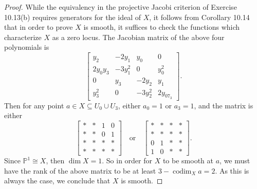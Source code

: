 \documentclass[12pt]{article}
\newcommand{\isp}[1]{\quad\text{#1}\quad}
\newcommand{\<}{\langle}
\renewcommand{\>}{\rangle}
\newcommand{\isom}{\cong}
\renewcommand{\P}{\mathbb{P}}
\DeclareMathOperator{\codim}{codim}
\begin{document}
\begin{proof}
    While the equivalency in the projective Jacobi criterion of Exercise 10.13(b) requires generators for the ideal of $X$, it follows from Corollary 10.14 that in order to prove $X$ is smooth, it suffices to check the functions which characterize $X$ as a zero locus. The Jacobian matrix of the above four polynomials is
    \[
        \begin{bmatrix}
            y_2 & -2y_1 & y_0 & 0 \\
            2y_0y_3 & -3y_1^2 & 0 & y_0^2 \\
            0 & y_3 & -2y_2 & y_1 \\
            y_3^2 & 0 & -3y_2^2 & 2y_07_3
        \end{bmatrix}.
    \]
    Then for any point $a \in X \subseteq U_0 \cup U_3$, either $a_0 = 1$ or $a_3 = 1$, and the matrix is either
    \[
        \begin{bmatrix}
            * & * & 1 & 0 \\
            * & * & 0 & 1 \\
            * & * & * & * \\
            * & * & * & *
        \end{bmatrix}
        \isp{or}
        \begin{bmatrix}
            * & * & * & * \\
            * & * & * & * \\
            0 & 1 & * & * \\
            1 & 0 & * & *
        \end{bmatrix}.
    \]
    Since $\P^1 \isom X$, then $\dim X = 1$. So in order for $X$ to be smooth at $a$, we must have the rank of the above matrix to be at least $3 - \codim_X{a} = 2$. As this is always the case, we conclude that $X$ is smooth.

\end{proof}
\end{document}

